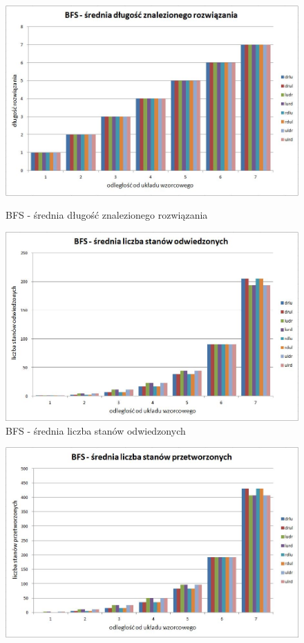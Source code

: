 \documentclass{classrep}
\begin{document}
{\begin{figure}[ht!]
	\begin{center}
		\vspace{0.3in}
		\includegraphics[scale=0.6]{bfs1}
		\caption{BFS - średnia długość znalezionego rozwiązania}
		\vspace{0.5in}
		\includegraphics[scale=0.6]{bfs2}
		\caption{BFS - średnia liczba stanów odwiedzonych}
	\end{center}
\end{figure}
\newpage
\begin{figure}[ht!]
	\begin{center}
		\vspace{0.3in}
		\includegraphics[scale=0.6]{bfs3}

\end{center}
\end{figure}}
\end{document}
